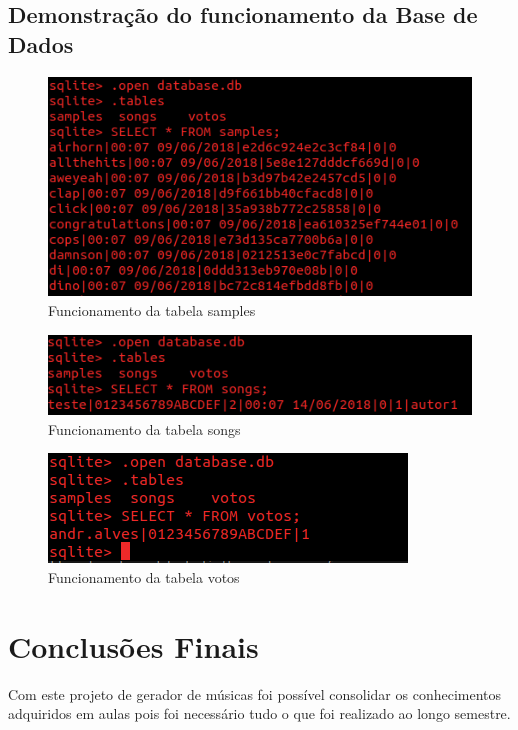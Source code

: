 \documentclass{report}
\begin{document}
\newpage
\section{Demonstração do funcionamento da Base de Dados}
\begin{figure} [h]
	\centering
	\includegraphics [scale = 0.4] {img/samples}
	\caption{Funcionamento da tabela samples}
\end{figure}

\begin{figure} [h]
	\centering
	\includegraphics [scale = 0.5] {img/songs}
	\caption{Funcionamento da tabela songs}
\end{figure}

\begin{figure} [h]
	\centering
	\includegraphics [scale = 0.5] {img/votos}
	\caption{Funcionamento da tabela votos}
\end{figure}

\newpage	 
\chapter{Conclusões Finais}
\label{chap.conclusao}
	Com este projeto de gerador de músicas foi possível consolidar os conhecimentos 
	adquiridos em aulas pois foi necessário tudo o que foi realizado ao longo semestre. 
	
\end{document}
